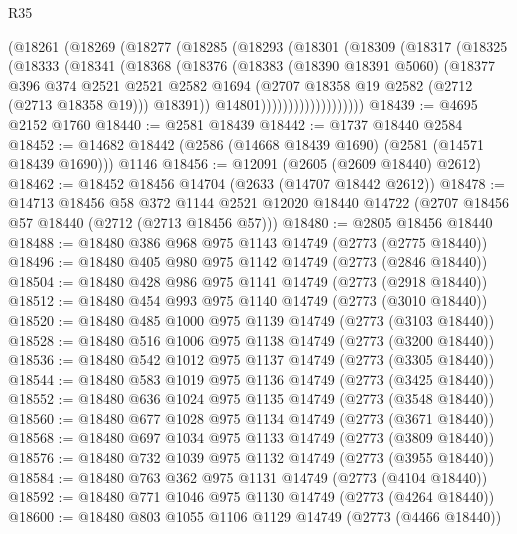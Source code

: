\begin{lexlean}{R35}
\begin{coremodule}
                (@18261
                  (@18269
                    (@18277
                      (@18285
                        (@18293
                          (@18301
                            (@18309
                              (@18317
                                (@18325
                                  (@18333
                                    (@18341
                                      (@18368
                                        (@18376
                                          (@18383
                                            (@18390 @18391 @5060)
                                            (@18377
                                              @396
                                              @374
                                              @2521
                                              @2521
                                              @2582
                                              @1694
                                              (@2707 @18358 @19 @2582 (@2712 (@2713 @18358 @19)))
                                              @18391))
                                          @14801)))))))))))))))))))
@18439 := @4695 @2152 @1760
@18440 := @2581 @18439
@18442 := @1737 @18440 @2584
@18452 := @14682 @18442 (@2586 (@14668 @18439 @1690) (@2581 (@14571 @18439 @1690))) @1146
@18456 := @12091 (@2605 (@2609 @18440) @2612)
@18462 := @18452 @18456 @14704 (@2633 (@14707 @18442 @2612))
@18478 := @14713
    @18456
    @58
    @372
    @1144
    @2521
    @12020
    @18440
    @14722
    (@2707 @18456 @57 @18440 (@2712 (@2713 @18456 @57)))
@18480 := @2805 @18456 @18440
@18488 := @18480 @386 @968 @975 @1143 @14749 (@2773 (@2775 @18440))
@18496 := @18480 @405 @980 @975 @1142 @14749 (@2773 (@2846 @18440))
@18504 := @18480 @428 @986 @975 @1141 @14749 (@2773 (@2918 @18440))
@18512 := @18480 @454 @993 @975 @1140 @14749 (@2773 (@3010 @18440))
@18520 := @18480 @485 @1000 @975 @1139 @14749 (@2773 (@3103 @18440))
@18528 := @18480 @516 @1006 @975 @1138 @14749 (@2773 (@3200 @18440))
@18536 := @18480 @542 @1012 @975 @1137 @14749 (@2773 (@3305 @18440))
@18544 := @18480 @583 @1019 @975 @1136 @14749 (@2773 (@3425 @18440))
@18552 := @18480 @636 @1024 @975 @1135 @14749 (@2773 (@3548 @18440))
@18560 := @18480 @677 @1028 @975 @1134 @14749 (@2773 (@3671 @18440))
@18568 := @18480 @697 @1034 @975 @1133 @14749 (@2773 (@3809 @18440))
@18576 := @18480 @732 @1039 @975 @1132 @14749 (@2773 (@3955 @18440))
@18584 := @18480 @763 @362 @975 @1131 @14749 (@2773 (@4104 @18440))
@18592 := @18480 @771 @1046 @975 @1130 @14749 (@2773 (@4264 @18440))
@18600 := @18480 @803 @1055 @1106 @1129 @14749 (@2773 (@4466 @18440))

\end{coremodule}
\end{lexlean}
